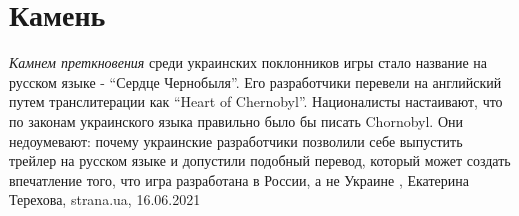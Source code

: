  
 
 
 
 
\chapter{Камень}
\label{sec:slova.kamenj}

\emph{Камнем преткновения} среди украинских поклонников игры стало название на русском
языке - \enquote{Сердце Чернобыля}. Его разработчики перевели на английский путем
транслитерации как \enquote{Heart of Chernobyl}.  Националисты настаивают, что по
законам украинского языка правильно было бы писать Chornobyl. Они недоумевают:
почему украинские разработчики позволили себе выпустить трейлер на русском
языке и допустили подобный перевод, который может создать впечатление того, что
игра разработана в России, а не Украине
, 
Екатерина Терехова, strana.ua, 16.06.2021
